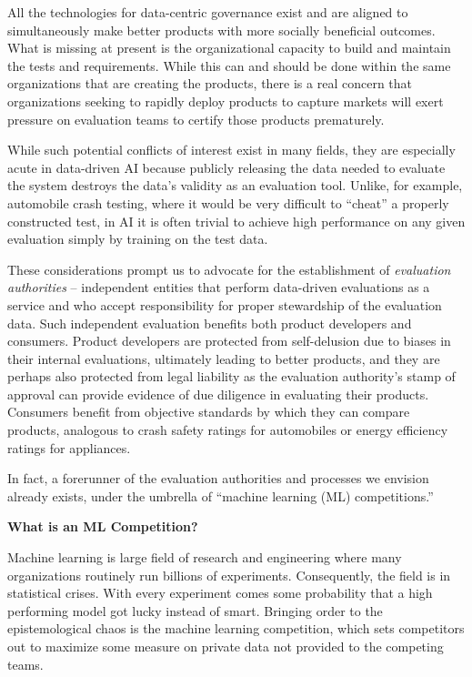 All the technologies for data-centric governance exist and are aligned to simultaneously make better products with more socially beneficial outcomes. What is missing at present is the organizational capacity to build and maintain the tests and requirements. While this can and should be done within the same organizations that are creating the products, there is a real concern that organizations seeking to rapidly deploy products to capture markets will exert pressure on evaluation teams to certify those products prematurely.

While such potential conflicts of interest exist in many fields, they are especially acute in data-driven AI because publicly releasing the data needed to evaluate the system destroys the data's validity as an evaluation tool. Unlike, for example, automobile crash testing, where it would be very difficult to ``cheat'' a properly constructed test, in AI it is often trivial to achieve high performance on any given evaluation simply by training on the test data. 

These considerations prompt us to advocate for the establishment of \emph{evaluation authorities} -- independent entities that perform data-driven evaluations as a service and who accept responsibility for proper stewardship of the evaluation data. Such independent evaluation benefits both product developers and consumers. Product developers are protected from self-delusion due to biases in their internal evaluations, ultimately leading to better products, and they are perhaps also protected from legal liability as the evaluation authority's stamp of approval can provide evidence of due diligence in evaluating their products. Consumers benefit from objective standards by which they can compare products, analogous to crash safety ratings for automobiles or energy efficiency ratings for appliances.

In fact, a forerunner of the evaluation authorities and processes we envision already exists, under the umbrella of ``machine learning (ML) competitions.''

\textbf{What is an ML Competition?}

Machine learning is large field of research and engineering where many organizations routinely run billions of experiments. Consequently, the field is in statistical crises. With every experiment comes some probability that a high performing model got lucky instead of smart. Bringing order to the epistemological chaos is the machine learning competition, which sets competitors out to maximize some measure on private data not provided to the competing teams.

